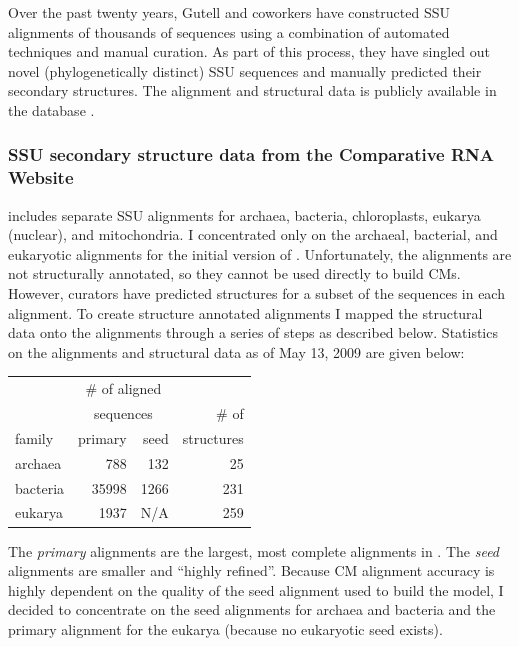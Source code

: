 Over the past twenty years, Gutell and coworkers have constructed SSU
alignments of thousands of sequences using a combination of automated
techniques and manual curation. As part of this process, they have
singled out novel (phylogenetically distinct) SSU sequences and
manually predicted their secondary structures. The alignment and
structural data is publicly available in the  database
\cite{CannoneGutell02}. 

\subsubsection{SSU secondary structure data from the Comparative RNA
  Website} 

 includes separate SSU alignments for archaea, bacteria,
chloroplasts, eukarya (nuclear), and mitochondria. I concentrated only
on the archaeal, bacterial, and eukaryotic alignments for the initial
version of .  Unfortunately, the  alignments
are not structurally annotated, so they cannot be used directly to
build CMs. However,  curators have predicted structures for a
subset of the sequences in each alignment.  To create structure
annotated alignments I mapped the structural data onto the alignments
through a series of steps as described below.  Statistics on the
 alignments and structural data as of May 13, 2009 are given
below:

\begin{center}
\begin{tabular}{l|rr|r}
       & \multicolumn{2}{c|}{\# of aligned}& \\
       & \multicolumn{2}{c|}{sequences}    & \# of \\ \cline {2-3}
family & primary & seed                   & structures \\ \hline
archaea&     788 &  132                   & 25 \\
bacteria&  35998 & 1266                   & 231 \\
eukarya&    1937 & N/A                    & 259 \\
\end{tabular}
\end{center}

The {\em primary} alignments are the largest, most complete alignments
in . The {\em seed} alignments are smaller and ``highly
refined''. Because CM alignment accuracy is highly dependent on the
quality of the seed alignment used to build the model, I decided to
concentrate on the seed alignments for archaea and bacteria and the
primary alignment for the eukarya (because no eukaryotic seed exists).


